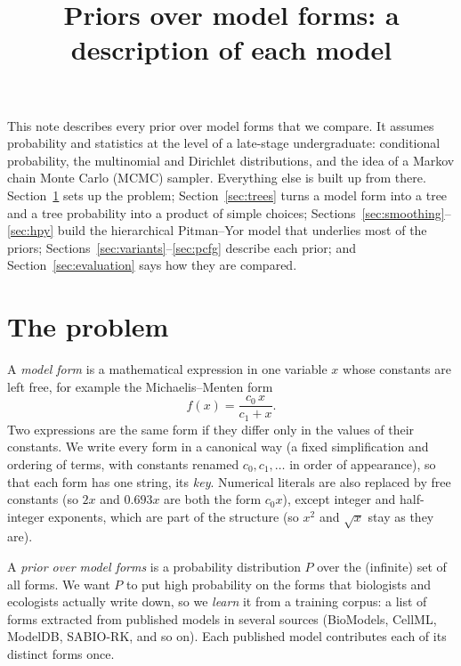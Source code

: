 \documentclass[11pt]{article}
\title{Priors over model forms: a description of each model}
\author{}
\date{}
\begin{document}
\maketitle

\noindent This note describes every prior over model forms that we compare. It assumes probability and
statistics at the level of a late-stage undergraduate: conditional probability, the multinomial and
Dirichlet distributions, and the idea of a Markov chain Monte Carlo (MCMC) sampler. Everything else is
built up from there. Section~\ref{sec:setup} sets up the problem; Section~\ref{sec:trees} turns a model
form into a tree and a tree probability into a product of simple choices;
Sections~\ref{sec:smoothing}--\ref{sec:hpy} build the hierarchical Pitman--Yor model that underlies most
of the priors; Sections~\ref{sec:variants}--\ref{sec:pcfg} describe each prior; and
Section~\ref{sec:evaluation} says how they are compared.

\section{The problem}\label{sec:setup}

A \emph{model form} is a mathematical expression in one variable $x$ whose constants are left free, for
example the Michaelis--Menten form
\[
  f(x) = \frac{c_0\, x}{c_1 + x}.
\]
Two expressions are the same form if they differ only in the values of their constants. We write every
form in a canonical way (a fixed simplification and ordering of terms, with constants renamed
$c_0, c_1, \dots$ in order of appearance), so that each form has one string, its \emph{key}. Numerical
literals are also replaced by free constants (so $2x$ and $0.693x$ are both the form $c_0 x$), except
integer and half-integer exponents, which are part of the structure (so $x^2$ and $\sqrt{x}$ stay as
they are).

A \emph{prior over model forms} is a probability distribution $P$ over the (infinite) set of all forms.
We want $P$ to put high probability on the forms that biologists and ecologists actually write down, so
we \emph{learn} it from a training corpus: a list of forms extracted from published models in several
sources (BioModels, CellML, ModelDB, SABIO-RK, and so on). Each published model contributes each of
its distinct forms once.
\end{document}
